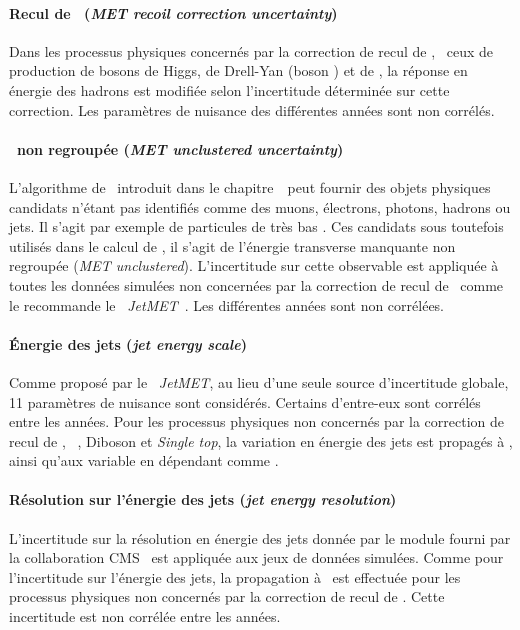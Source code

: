\paragraph{Recul de \MET\ (\emph{MET recoil correction uncertainty})}
Dans les processus physiques concernés par la correction de recul de \MET,
\ie\ ceux de production de bosons de Higgs, de Drell-Yan (boson \Zboson) et de \Wjets,
la réponse en énergie des hadrons est modifiée selon l'incertitude déterminée sur cette correction.
Les paramètres de nuisance des différentes années sont non corrélés.
\paragraph{\MET\ non regroupée (\emph{MET unclustered uncertainty})}
L'algorithme de \PF\ introduit dans le chapitre~\ peut fournir des objets physiques candidats n'étant pas identifiés comme des muons, électrons, photons, hadrons ou jets.
Il s'agit par exemple de particules de très bas \pT.
Ces candidats sous toutefois utilisés dans le calcul de \MET, il s'agit de l'énergie transverse manquante non regroupée (\emph{MET unclustered}).
L'incertitude sur cette observable est appliquée à toutes les données simulées non concernées par la correction de recul de \MET\ comme le recommande le \POG\ \emph{JetMET}~\cite{MET_corrections}.
Les différentes années sont non corrélées.
\paragraph{Énergie des jets (\emph{jet energy scale})}
Comme proposé par le \POG\ \emph{JetMET}, au lieu d'une seule source d'incertitude globale, 11 paramètres de nuisance sont considérés.
Certains d'entre-eux sont corrélés entre les années.
Pour les processus physiques non concernés par la correction de recul de \MET, \ie\ \ttbar, Diboson et \emph{Single top}, la variation en énergie des jets est propagés à \MET, ainsi qu'aux variable en dépendant comme \mTtot.
\paragraph{Résolution sur l'énergie des jets (\emph{jet energy resolution})}
L'incertitude sur la résolution en énergie des jets donnée par le module fourni par la collaboration CMS~\cite{JetResolution} est appliquée aux jeux de données simulées.
Comme pour l'incertitude sur l'énergie des jets, la propagation à \MET\ est effectuée pour les processus physiques non concernés par la correction de recul de \MET.
Cette incertitude est non corrélée entre les années.
